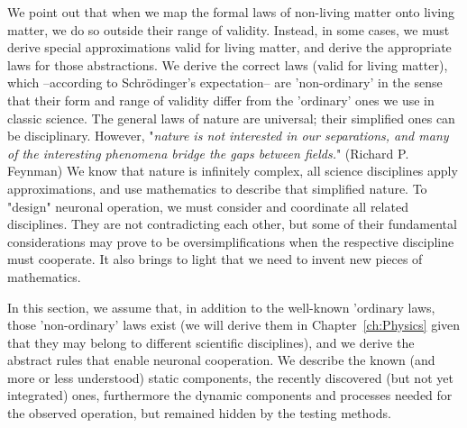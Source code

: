 We point out that when we map the formal laws of non-living matter onto living matter, we do so outside their range of validity. Instead, in some cases, we must derive special approximations valid for living matter, and derive the
appropriate laws for those abstractions. 
We derive the correct laws (valid for living matter), which 
--according to Schrödinger's expectation-- are 'non-ordinary' in the sense
that their form and range of validity differ from the 'ordinary' ones
we use in classic science. The general laws of nature are universal; their
simplified ones can be disciplinary. However, "\textit{nature is not interested in our separations, and many of the interesting phenomena bridge the gaps between fields.}" (Richard P. Feynman)
We know that nature is infinitely complex, all science disciplines
apply approximations, and use mathematics to describe that
simplified nature.
To "design" neuronal operation, we must consider and coordinate all related disciplines. They are
not contradicting each other, but some of their fundamental considerations may prove to be oversimplifications when the respective discipline must 
cooperate. It also brings to light that we need to
invent new pieces of mathematics.

In this section, we assume that, in addition to the well-known
'ordinary laws, those 'non-ordinary' laws exist
(we will derive them in Chapter~\ref{ch:Physics} given that they may belong 
to different scientific disciplines),
and we derive the abstract rules that enable neuronal cooperation.
We describe the known (and more or less understood) static components,
the recently discovered (but not yet integrated) ones, furthermore
the dynamic components and processes needed for the observed operation, 
but remained hidden by the testing methods.
 

